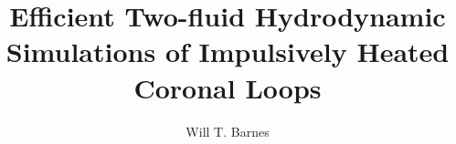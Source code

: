 \documentclass[12pt]{ruthesis}
\title{Efficient Two-fluid Hydrodynamic Simulations of Impulsively Heated Coronal Loops}
\author{Will T. Barnes}
\begin{document}
	\begin{frontmatter}
		\maketitle
		
		{%
		 \tableofcontents
		 \listoffigures
		 \listoftables
		}
	\end{frontmatter}
	

	
	
	
	
	
	

	\appendix
	
	

	
\end{document}
